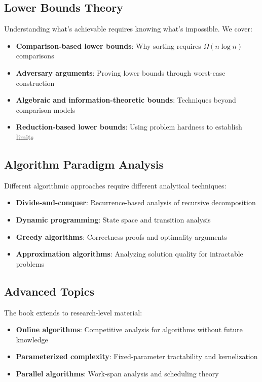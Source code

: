\subsection{Lower Bounds Theory}

Understanding what's achievable requires knowing what's impossible. We cover:

\begin{itemize}
    \item \textbf{Comparison-based lower bounds}: Why sorting requires $\Omega(n \log n)$ comparisons
    \item \textbf{Adversary arguments}: Proving lower bounds through worst-case construction
    \item \textbf{Algebraic and information-theoretic bounds}: Techniques beyond comparison models
    \item \textbf{Reduction-based lower bounds}: Using problem hardness to establish limits
\end{itemize}

\subsection{Algorithm Paradigm Analysis}

Different algorithmic approaches require different analytical techniques:

\begin{itemize}
    \item \textbf{Divide-and-conquer}: Recurrence-based analysis of recursive decomposition
    \item \textbf{Dynamic programming}: State space and transition analysis
    \item \textbf{Greedy algorithms}: Correctness proofs and optimality arguments
    \item \textbf{Approximation algorithms}: Analyzing solution quality for intractable problems
\end{itemize}

\subsection{Advanced Topics}

The book extends to research-level material:

\begin{itemize}
    \item \textbf{Online algorithms}: Competitive analysis for algorithms without future knowledge
    \item \textbf{Parameterized complexity}: Fixed-parameter tractability and kernelization
    \item \textbf{Parallel algorithms}: Work-span analysis and scheduling theory
\end{itemize}

